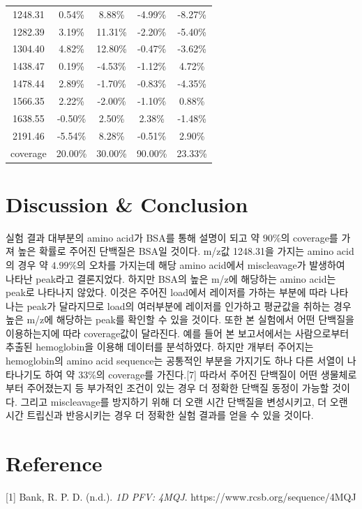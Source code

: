 \documentclass[%
 reprint,
 amsmath,amssymb,
 aps,
]{revtex4-2}
\begin{document}
\begin{table}[]
\begin{tabular}{c|c|c|c|c}
1248.31 & 0.54\% &8.88\% &-4.99\% &-8.27\%\\
1282.39 & 3.19\% &11.31\% &-2.20\% &-5.40\%\\
1304.40 & 4.82\% &12.80\% &-0.47\% &-3.62\%\\
1438.47 & 0.19\% &-4.53\% &-1.12\% &4.72\%\\
1478.44 & 2.89\% &-1.70\% &-0.83\% &-4.35\%\\
1566.35 & 2.22\% &-2.00\% &-1.10\% &0.88\%\\
1638.55 & -0.50\% &2.50\% &2.38\% &-1.48\%\\
2191.46 & -5.54\% &8.28\% &-0.51\% &2.90\%\\ \hline
coverage & 20.00\% & 30.00\% & 90.00\% & 23.33\% \\  \hline \hline 
\end{tabular}
\end{table}


\section{\label{sec:level1}Discussion \& Conclusion}
실험 결과 대부분의 amino acid가 BSA를 통해 설명이 되고 약 $90\%$의 coverage를 가져 높은 확률로 주어진 단백질은 BSA일 것이다. m/z값 1248.31을 가지는 amino acid의 경우 약 $4.99\%$의 오차를 가지는데 해당 amino acid에서 miscleavage가 발생하여 나타난 peak라고 결론지었다. 하지만 BSA의 높은 m/z에 해당하는 amino acid는 peak로 나타나지 않았다. 이것은 주어진 load에서 레이저를 가하는 부분에 따라 나타나는 peak가 달라지므로 load의 여러부분에 레이저를 인가하고 평균값을 취하는 경우 높은 m/z에 해당하는 peak를 확인할 수 있을 것이다. 또한 본 실험에서 어떤 단백질을 이용하는지에 따라 coverage값이 달라진다. 예를 들어 본 보고서에서는 사람으로부터 추출된 hemoglobin을 이용해 데이터를 분석하였다. 하지만 개부터 주어지는 hemoglobin의 amino acid sequence는 공통적인 부분을 가지기도 하나 다른 서열이 나타나기도 하여 약 33\%의 coverage를 가진다.[7] 따라서 주어진 단백질이 어떤 생물체로부터 주어졌는지 등 부가적인 조건이 있는 경우 더 정확한 단백질 동정이 가능할 것이다. 그리고 miscleavage를 방지하기 위해 더 오랜 시간 단백질을 변성시키고, 더 오랜 시간 트립신과 반응시키는 경우 더 정확한 실험 결과를 얻을 수 있을 것이다.

\section{\label{sec:level1}Reference}
[1] Bank, R. P. D. (n.d.). \textit{1D PFV: 4MQJ}. https://www.rcsb.org/sequence/4MQJ
\end{document}
